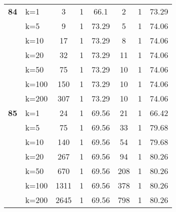 \begin{table}[htbp]
\begin{tabular}{|l|l|c|c|c|c|c|c|}
    \multicolumn{1}{|r|}{\textbf{84}} & k=1 & 3 & 1 & 66.1 & 2 & 1 & 73.29 \\ 
     & k=5 & 9 & 1 & 73.29 & 5 & 1 & 74.06 \\ 
     & k=10 & 17 & 1 & 73.29 & 8 & 1 & 74.06 \\ 
     & k=20 & 32 & 1 & 73.29 & 11 & 1 & 74.06 \\ 
     & k=50 & 75 & 1 & 73.29 & 10 & 1 & 74.06 \\ 
     & k=100 & 150 & 1 & 73.29 & 10 & 1 & 74.06 \\ 
     & k=200 & 307 & 1 & 73.29 & 10 & 1 & 74.06 \\ \hline
    \multicolumn{1}{|r|}{\textbf{85}} & k=1 & 24 & 1 & 69.56 & 21 & 1 & 66.42 \\ 
     & k=5 & 75 & 1 & 69.56 & 33 & 1 & 79.68 \\ 
     & k=10 & 140 & 1 & 69.56 & 54 & 1 & 79.68 \\ 
     & k=20 & 267 & 1 & 69.56 & 94 & 1 & 80.26 \\ 
     & k=50 & 670 & 1 & 69.56 & 208 & 1 & 80.26 \\ 
     & k=100 & 1311 & 1 & 69.56 & 378 & 1 & 80.26 \\ 
     & k=200 & 2645 & 1 & 69.56 & 798 & 1 & 80.26 \\ \hline
    \end{tabular}
\end{table}
